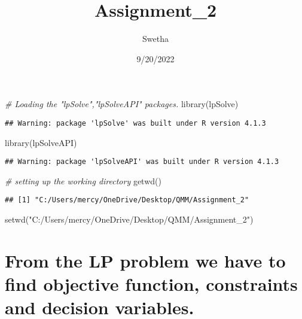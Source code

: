\documentclass[
]{article}
\title{Assignment\_2}
\author{Swetha}
\date{9/20/2022}
\newenvironment{Shaded}{\begin{snugshade}}{\end{snugshade}}
\newcommand{\CommentTok}[1]{\textcolor[rgb]{0.56,0.35,0.01}{\textit{#1}}}
\newcommand{\FunctionTok}[1]{\textcolor[rgb]{0.00,0.00,0.00}{#1}}
\newcommand{\NormalTok}[1]{#1}
\newcommand{\StringTok}[1]{\textcolor[rgb]{0.31,0.60,0.02}{#1}}
\begin{document}
\maketitle

\begin{Shaded}
\begin{Highlighting}[]
\CommentTok{\# Loading the "lpSolve","lpSolveAPI" packages.}
\FunctionTok{library}\NormalTok{(lpSolve)}
\end{Highlighting}
\end{Shaded}

\begin{verbatim}
## Warning: package 'lpSolve' was built under R version 4.1.3
\end{verbatim}

\begin{Shaded}
\begin{Highlighting}[]
\FunctionTok{library}\NormalTok{(lpSolveAPI)}
\end{Highlighting}
\end{Shaded}

\begin{verbatim}
## Warning: package 'lpSolveAPI' was built under R version 4.1.3
\end{verbatim}

\begin{Shaded}
\begin{Highlighting}[]
\CommentTok{\# setting up the working directory}
\FunctionTok{getwd}\NormalTok{()}
\end{Highlighting}
\end{Shaded}

\begin{verbatim}
## [1] "C:/Users/mercy/OneDrive/Desktop/QMM/Assignment_2"
\end{verbatim}

\begin{Shaded}
\begin{Highlighting}[]
\FunctionTok{setwd}\NormalTok{(}\StringTok{"C:/Users/mercy/OneDrive/Desktop/QMM/Assignment\_2"}\NormalTok{)}
\end{Highlighting}
\end{Shaded}

\hypertarget{from-the-lp-problem-we-have-to-find-objective-function-constraints-and-decision-variables.}{%
\section{From the LP problem we have to find objective function,
constraints and decision
variables.}\label{from-the-lp-problem-we-have-to-find-objective-function-constraints-and-decision-variables.}}
\end{document}
